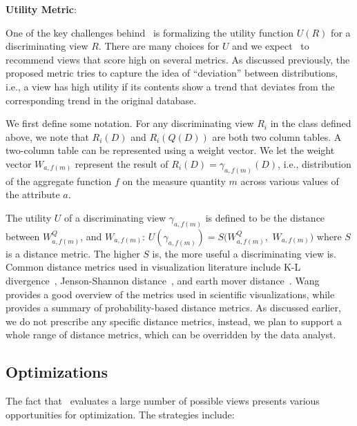 {\bf Utility Metric}:

One of the key challenges behind \SeeDB\ 
is formalizing the utility function $U(R)$ for a discriminating view $R$. 
There are many choices for $U$ and we expect \SeeDB\ 
to recommend views that score high on several metrics. 
As discussed previously, the proposed metric tries to capture the idea of
``deviation'' between distributions, i.e., a view has high utility if its
contents show a trend that deviates from the corresponding trend in the original
database.

We first define some notation. For any discriminating view $R_i$ 
in the class defined above, we note that $R_i(D)$ and $R_i(Q(D))$ 
are both two column tables. 
A two-column table can be represented using a weight vector.
We let the weight vector $W_{a, f(m)}$ represent the 
result of $R_i(D) = \gamma_{a, f(m)}(D)$, i.e., 
distribution of the aggregate function $f$ on the measure quantity $m$ 
across various values of the attribute $a$. 

The utility $U$ of a discriminating view $\gamma_{a, f(m)}$ is defined to be the
distance between $W_{a, f(m)}^Q$, and $W_{a, f(m)}$:
$U(\gamma_{a, f(m)}) = S(W_{a, f(m)}^Q, $ $W_{a, f(m)})$ where $S$ is a distance
metric. The higher $S$ is, the more useful a discriminating view is.
Common distance metrics used in visualization literature include K-L
divergence~\cite{wikipedia-KL}, Jenson-Shannon
distance~\cite{wikipedia-JS,entropy-vis}, and earth mover
distance~\cite{wikipedia-prob-dist}.
Wang~\cite{entropy-vis} provides a good overview of the metrics used in
scientific visualizations, while \cite{wikipedia-prob-dist} provides a summary
of probability-based distance metrics.
As discussed earlier, we do not prescribe any specific distance metrics,
instead, we plan to support a whole range of distance metrics, which can be
overridden by the data analyst.

\subsection{Optimizations}
\label{optimizations}

The fact that \SeeDB\ evaluates a large number of possible views presents
various opportunities for optimization. The strategies include:

